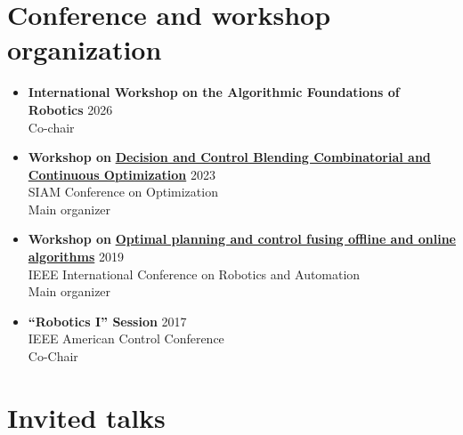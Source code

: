 \documentclass[11pt,a4paper,sans]{moderncv}
\begin{document}
%

\section{Conference and workshop organization}

\vspace{5pt}

\begin{itemize}
	
\item \textbf{International Workshop on the Algorithmic Foundations of Robotics} \hfill 2026 \\
Co-chair

\item \textbf{Workshop on} \href{https://meetings.siam.org/sess/dsp_programsess.cfm?SESSIONCODE=76788}{\color{cyan}\textbf{Decision and Control Blending Combinatorial and Continuous Optimization}} \hfill 2023 \\
SIAM Conference on Optimization \\
Main organizer

\item \textbf{Workshop on} \href{https://sites.google.com/mit.edu/icra19ws}{\color{cyan}\textbf{Optimal planning and control fusing offline and online algorithms}} \hfill 2019 \\
IEEE International Conference on Robotics and Automation \\
Main organizer

\item \textbf{``Robotics I'' Session} \hfill 2017 \\
IEEE American Control Conference \\
Co-Chair

\end{itemize}


\section{Invited talks}
\end{document}
